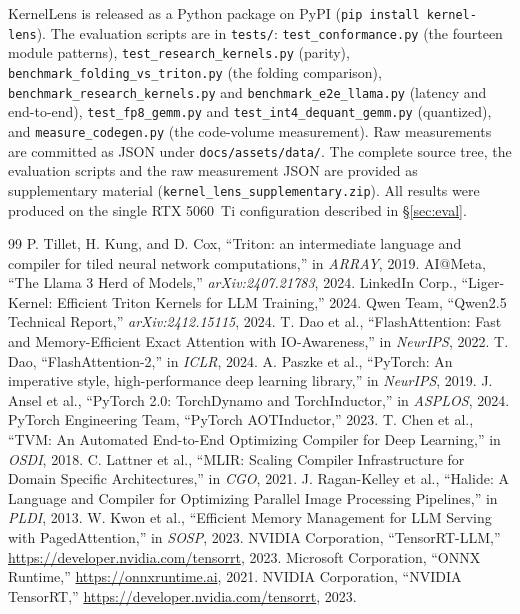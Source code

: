 \documentclass{article}
\begin{document}
KernelLens is released as a Python package on PyPI (\texttt{pip install
kernel-lens}). The
evaluation scripts are in \texttt{tests/}: \texttt{test\_conformance.py} (the
fourteen module patterns), \texttt{test\_research\_kernels.py} (parity),
\texttt{benchmark\_folding\_vs\_triton.py} (the folding comparison),
\texttt{benchmark\_research\_kernels.py} and \texttt{benchmark\_e2e\_llama.py}
(latency and end-to-end), \texttt{test\_fp8\_gemm.py} and
\texttt{test\_int4\_dequant\_gemm.py} (quantized), and
\texttt{measure\_codegen.py} (the code-volume measurement). Raw measurements are
committed as JSON under \texttt{docs/assets/data/}. The complete source tree, the
evaluation scripts and the raw measurement JSON are provided as supplementary
material (\texttt{kernel\_lens\_supplementary.zip}). All results were produced on
the single RTX 5060~Ti configuration described in \S\ref{sec:eval}.

\FloatBarrier
\begin{thebibliography}{99}
 P. Tillet, H. Kung, and D. Cox, ``Triton: an intermediate language and compiler for tiled neural network computations,'' in \textit{ARRAY}, 2019.
 AI@Meta, ``The Llama 3 Herd of Models,'' \textit{arXiv:2407.21783}, 2024.
 LinkedIn Corp., ``Liger-Kernel: Efficient Triton Kernels for LLM Training,'' 2024.
 Qwen Team, ``Qwen2.5 Technical Report,'' \textit{arXiv:2412.15115}, 2024.
 T. Dao et al., ``FlashAttention: Fast and Memory-Efficient Exact Attention with IO-Awareness,'' in \textit{NeurIPS}, 2022.
 T. Dao, ``FlashAttention-2,'' in \textit{ICLR}, 2024.
 A. Paszke et al., ``PyTorch: An imperative style, high-performance deep learning library,'' in \textit{NeurIPS}, 2019.
 J. Ansel et al., ``PyTorch 2.0: TorchDynamo and TorchInductor,'' in \textit{ASPLOS}, 2024.
 PyTorch Engineering Team, ``PyTorch AOTInductor,'' 2023.
 T. Chen et al., ``TVM: An Automated End-to-End Optimizing Compiler for Deep Learning,'' in \textit{OSDI}, 2018.
 C. Lattner et al., ``MLIR: Scaling Compiler Infrastructure for Domain Specific Architectures,'' in \textit{CGO}, 2021.
 J. Ragan-Kelley et al., ``Halide: A Language and Compiler for Optimizing Parallel Image Processing Pipelines,'' in \textit{PLDI}, 2013.
 W. Kwon et al., ``Efficient Memory Management for LLM Serving with PagedAttention,'' in \textit{SOSP}, 2023.
 NVIDIA Corporation, ``TensorRT-LLM,'' \url{https://developer.nvidia.com/tensorrt}, 2023.
 Microsoft Corporation, ``ONNX Runtime,'' \url{https://onnxruntime.ai}, 2021.
 NVIDIA Corporation, ``NVIDIA TensorRT,'' \url{https://developer.nvidia.com/tensorrt}, 2023.
\end{thebibliography}
\end{document}
